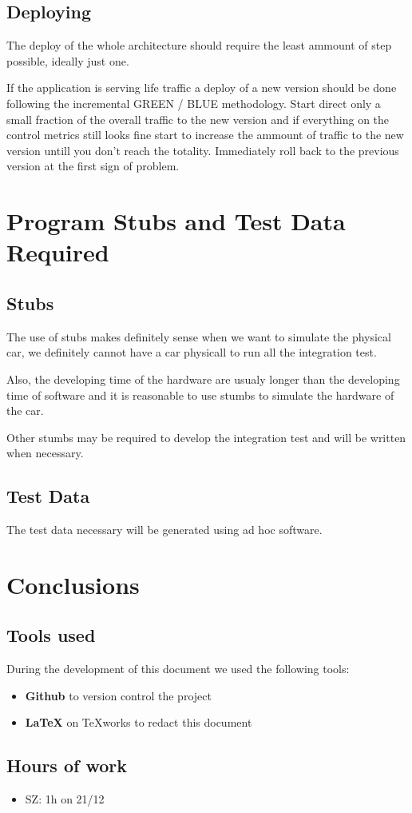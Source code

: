 \documentclass[11pt]{article} %
\begin{document}
\subsection{Deploying}

The deploy of the whole architecture should require the least ammount of step possible, ideally just one.

If the application is serving life traffic a deploy of a new version should be done following the incremental GREEN / BLUE methodology. Start direct only a small fraction of the overall traffic to the new version and if everything on the control metrics still looks fine start to increase the ammount of traffic to the new version untill you don't reach the totality. Immediately roll back to the previous version at the first sign of problem.

\newpage
\section{Program Stubs and Test Data Required}

\subsection{Stubs}

The use of stubs makes definitely sense when we want to simulate the physical car, we definitely cannot have a car physicall to run all the integration test.

Also, the developing time of the hardware are usualy longer than the developing time of software and it is reasonable to use stumbs to simulate the hardware of the car.

Other stumbs may be required to develop the integration test and will be written when necessary.

\subsection{Test Data}

The test data necessary will be generated using ad hoc software.


\newpage
\section{Conclusions}

\subsection{Tools used}
During the development of this document we used the following tools:
\begin{itemize}
	\item \textbf{Github} to version control the project
	\item \textbf{\LaTeX} on TeXworks to redact this document
\end{itemize}

\subsection{Hours of work}
\begin{itemize}
	\item SZ: 1h on 21/12
\end{itemize}
\end{document}
